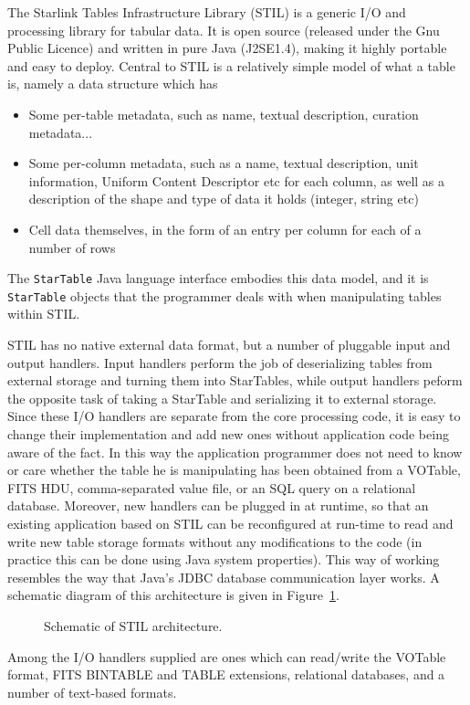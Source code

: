 \documentclass[11pt,twoside]{article}  %
\begin{document}
The Starlink Tables Infrastructure Library (STIL) is a generic I/O
and processing library for tabular data.  It is open source (released
under the Gnu Public Licence) and written in pure Java (J2SE1.4),
making it highly portable and easy to deploy.
Central to STIL is a relatively simple model of what a table is, namely
a data structure which has
\begin{itemize}
\item Some per-table metadata, 
      such as name, textual description, curation metadata...
\item Some per-column metadata,
      such as a name, textual description, unit information, 
      Uniform Content Descriptor etc for each column, as well as 
      a description of the shape and type of data it holds 
      (integer, string etc)
\item Cell data themselves, in the form of an entry per column 
      for each of a number of rows
\end{itemize}
The {\tt StarTable} Java language interface embodies this data model,
and it is {\tt StarTable} objects that the programmer deals with
when manipulating tables within STIL.

STIL has no native external data format, but a number of pluggable
input and output handlers.  Input handlers perform the job of 
deserializing tables from external storage and turning them into 
StarTables, while output handlers peform the opposite task of taking
a StarTable and serializing it to external storage.
Since these I/O handlers are separate from the core processing code,
it is easy to change their implementation and add new ones 
without application code being aware of the fact.
In this way the application programmer does not need to know or
care whether the table he is manipulating has been obtained from
a VOTable, FITS HDU, comma-separated value file, or an SQL query
on a relational database.  Moreover, new handlers can be plugged
in at runtime, so that an existing application based on STIL can 
be reconfigured at run-time to read and write new table storage 
formats without any modifications to the code (in practice this
can be done using Java system properties).  This way of working
resembles the way that Java's JDBC database communication layer works.
A schematic diagram of this architecture is given in Figure~\ref{FM3-fig-1}.
\begin{figure}
\caption{Schematic of STIL architecture.} \label{FM3-fig-1}
\end{figure}
Among the I/O handlers supplied are ones which can read/write 
the VOTable format, 
FITS BINTABLE and TABLE extensions, 
relational databases, 
and a number of text-based formats.
\end{document}
